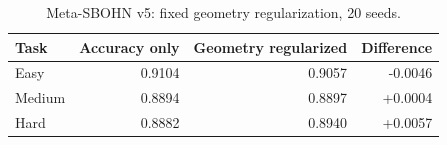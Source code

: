 \begin{table}[h]
\centering
\caption{Meta-SBOHN v5: fixed geometry regularization, 20 seeds.}
\begin{tabular}{l r r r}
\hline
Task & Accuracy only & Geometry regularized & Difference \\
\hline
Easy & 0.9104 & 0.9057 & -0.0046 \\
Medium & 0.8894 & 0.8897 & +0.0004 \\
Hard & 0.8882 & 0.8940 & +0.0057 \\
\hline
\end{tabular}
\end{table}
